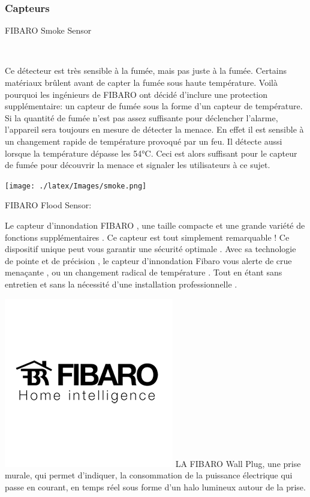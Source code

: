 \subsubsection{Capteurs}

\begin{description}
\item[FIBARO Smoke Sensor] \hfill \\

\end{description}
Ce détecteur est très sensible à la fumée, mais pas juste à la fumée. Certains matériaux brûlent avant de capter la fumée sous haute température.
Voilà pourquoi les ingénieurs de  FIBARO ont décidé d'inclure une protection supplémentaire: un capteur de fumée sous la forme d'un capteur de température.
 Si la quantité de fumée n'est pas assez suffisante pour déclencher l'alarme, l'appareil sera toujours en mesure de détecter la menace.
En effet il est sensible à un changement rapide de température provoqué par un feu. Il détecte aussi lorsque la température dépasse les 54°C. Ceci est alors suffisant pour le capteur de fumée pour découvrir la menace et signaler les utilisateurs à ce sujet. 

\texttt{[image: ./latex/Images/smoke.png]}\newline


FIBARO Flood Sensor:

Le capteur d'innondation FIBARO , une taille compacte et une grande variété de fonctions supplémentaires . Ce capteur est tout simplement remarquable ! Ce dispositif unique peut vous garantir une sécurité optimale . Avec sa technologie de pointe et de précision , le capteur d'innondation Fibaro vous alerte de crue menaçante , ou un changement radical de température . Tout en étant sans entretien et sans la nécessité d'une installation professionnelle .

\includegraphics[scale=0.5]{./latex/Images/png/Fibaro.png}\newline
LA FIBARO Wall Plug, une prise murale, qui permet d'indiquer, la consommation de la puissance électrique qui passe en courant, en temps réel sous forme d'un halo lumineux autour de la prise.

